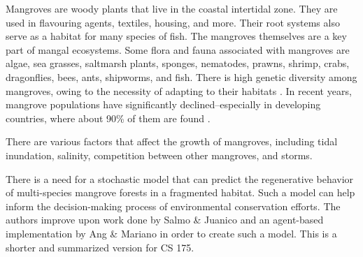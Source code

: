 Mangroves are woody plants that live in the coastal intertidal zone.
They are used in flavouring agents, textiles, housing, and more. Their root systems
also serve as a habitat for many species of fish. 
The mangroves themselves are a key part of mangal ecosystems. Some flora and fauna associated
with mangroves are algae, sea grasses, saltmarsh plants, sponges, nematodes, prawns, shrimp,
crabs, dragonflies, bees, ants, shipworms, and fish. 
There is high genetic diversity among mangroves, owing to the necessity of adapting to their habitats \cite{biologyOfMangroves}. In recent years, mangrove populations have significantly
declined--especially in developing countries, where about 90\% of them are found \cite{kavanagh2007}.

There are various factors that affect the growth of mangroves, including tidal
inundation, salinity, competition between other mangroves, and storms. 

There is a need for a stochastic model that can predict the regenerative
behavior of multi-species mangrove forests in a fragmented
habitat. Such a model can help inform the decision-making process of environmental
conservation efforts. The authors improve upon work done by Salmo \& Juanico \cite{SalmoJuanico2015} and an agent-based implementation by Ang \& Mariano \cite{mangrovesAngMariano} in order to create such a model. This is a shorter and summarized
version for CS 175.